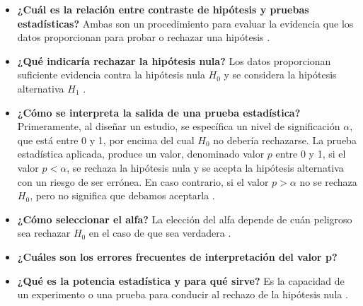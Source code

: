 \documentclass[12pt,letterpaper]{article}
\begin{document}
\begin{itemize}
	\item \textbf{¿Cuál es la relación entre contraste de hipótesis y pruebas estadísticas?} Ambas son un procedimiento para evaluar la evidencia que los datos proporcionan para probar o rechazar una hipótesis \cite{pestad}. 
	
	\item \textbf{¿Qué indicaría rechazar la hipótesis nula?}  Los datos proporcionan suficiente evidencia contra la hipótesis nula $H_0$ y se considera la hipótesis alternativa $H_1$ \cite{pestad}. 
	
	\item \textbf{¿Cómo se interpreta la salida de una prueba estadística?} Primeramente, al diseñar un estudio, se específica un nivel de significación $\alpha$, que está entre 0 y 1, por encima del cual $H_0$ no debería rechazarse. La prueba estadística aplicada, produce un valor, denominado valor $p$ entre 0 y 1, si el valor $p<\alpha$, se rechaza la hipótesis nula y se acepta la hipótesis alternativa con un riesgo de ser errónea. En caso contrario, si el valor $p>\alpha$ no se rechaza $H_0$, pero no significa que debamos aceptarla \cite{pestad}.
	
	\item\textbf{¿Cómo seleccionar el alfa?} La elección del alfa depende de cuán peligroso sea rechazar $H_0$ en el caso de que sea verdadera \cite{pestad}.
	
	\item\textbf{¿Cuáles son los errores frecuentes de interpretación del valor p?}
	
	\item \textbf{¿Qué es la potencia estadística y para qué sirve?} Es la capacidad de un experimento o una prueba para conducir al rechazo de la hipótesis nula \cite{pestad}.
	

\end{itemize}
\end{document}
